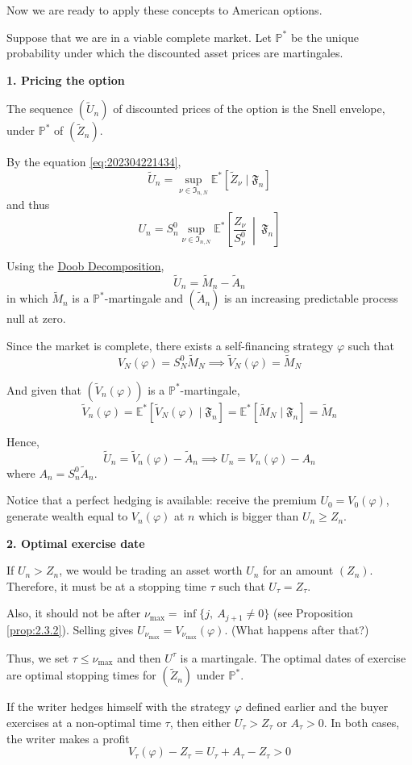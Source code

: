 Now we are ready to apply these concepts to American options.

\begin{example}
    Suppose that we are in a viable complete market. Let $\mathbb{P}^\ast$ be the unique probability under which the discounted asset prices are martingales. 

    \textbf{1. Pricing the option}

    The sequence $(\tilde{U}_n)$ of discounted prices of the option is the Snell envelope, under $\mathbb{P}^\ast$ of $(\tilde{Z}_n)$.

    By the equation \eqref{eq:202304221434},
    \[
        \tilde{U}_n = \sup_{\nu \in \mathfrak{I}_{n, N}} \mathbb{E}^\ast[\tilde{Z}_{\nu} \mid \mathfrak{F}_n]
    \]
    and thus 
    \[
        U_n = S_n^0 \sup_{\nu \in \mathfrak{I}_{n, N}} \mathbb{E}^\ast \left[\frac{Z_{\nu}}{S_\nu^0} ~ \middle| ~ \mathfrak{F}_n \right]
    \]

    Using the \hyperref[prop:doob-decomposition]{Doob Decomposition}, 
    \[
        \tilde{U}_n = \tilde{M}_n - \tilde{A}_n
    \]
    in which $\tilde{M}_n$ is a $\mathbb{P}^\ast$-martingale and $(\tilde{A}_n)$ is an increasing predictable process null at zero.

    Since the market is complete, there exists a self-financing strategy $\varphi$ such that 
    \[
        V_N(\varphi) = S_N^0 \tilde{M}_N \implies \tilde{V}_N(\varphi) = \tilde{M}_N
    \]

    And given that $(\tilde{V}_n(\varphi))$ is a $\mathbb{P}^\ast$-martingale,
    \[
        \tilde{V}_n(\varphi) = \mathbb{E}^\ast[\tilde{V}_N(\varphi) \mid \mathfrak{F}_n] = \mathbb{E}^\ast[\tilde{M}_N \mid \mathfrak{F}_n] = \tilde{M}_n
    \]

    Hence, 
    \[
        \tilde{U}_n = \tilde{V}_n(\varphi) - \tilde{A}_n \implies U_n = V_n(\varphi) - A_n
    \]
    where $A_n = S_n^0 \tilde{A}_n$. 

    Notice that a perfect hedging is available: receive the premium $U_0 = V_0(\varphi)$, generate wealth equal to $V_n(\varphi)$ at $n$ which is bigger than $U_n \ge Z_n$.

    \textbf{2. Optimal exercise date}

    If $U_n > Z_n$, we would be trading an asset worth $U_n$ for an amount $(Z_n)$. Therefore, it must be at a stopping time $\tau$ such that $U_\tau = Z_\tau$.

    Also, it should not be after $\nu_{\max} = \inf \{j, ~A_{j+1} \neq 0 \}$ (see Proposition \ref{prop:2.3.2}). Selling gives $U_{\nu_{\max}} = V_{\nu_{\max}}(\varphi)$. (What happens after that?)

    Thus, we set $\tau \le \nu_{\max}$ and then $U^\tau$ is a martingale. The optimal dates of exercise are optimal stopping times for $(\tilde{Z}_n)$ under $\mathbb{P}^\ast$. 

    If the writer hedges himself with the strategy $\varphi$ defined earlier and the buyer exercises at a non-optimal time $\tau$, then either $U_\tau > Z_\tau$ or $A_\tau > 0$. In both cases, the writer makes a profit 
    \[
        V_\tau(\varphi) - Z_\tau = U_\tau + A_\tau - Z_\tau > 0
    \]
\end{example}

